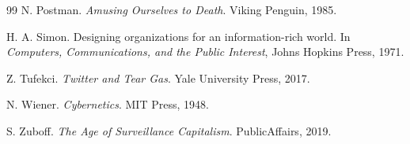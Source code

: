 \documentclass[12pt]{article}
\begin{document}
\begin{thebibliography}{99}
N. Postman.
\newblock \emph{Amusing Ourselves to Death}.
\newblock Viking Penguin, 1985.

H. A. Simon.
\newblock Designing organizations for an information-rich world.
\newblock In \emph{Computers, Communications, and the Public Interest}, Johns Hopkins Press, 1971.

Z. Tufekci.
\newblock \emph{Twitter and Tear Gas}.
\newblock Yale University Press, 2017.

N. Wiener.
\newblock \emph{Cybernetics}.
\newblock MIT Press, 1948.

S. Zuboff.
\newblock \emph{The Age of Surveillance Capitalism}.
\newblock PublicAffairs, 2019.

\end{thebibliography}
\end{document}
